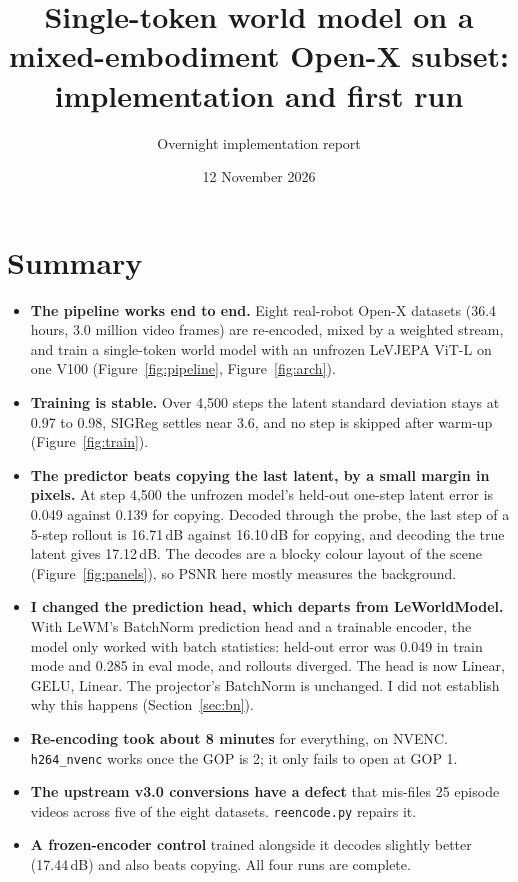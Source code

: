 \documentclass[10pt]{article}
\title{Single-token world model on a mixed-embodiment Open-X subset:\\ implementation and first run}
\author{Overnight implementation report}
\date{12 November 2026}
\newcommand{\code}[1]{\texttt{\small #1}}
\begin{document}
\maketitle

\section{Summary}
\begin{itemize}
\item \textbf{The pipeline works end to end.} Eight real-robot Open-X datasets (36.4 hours,
  3.0 million video frames) are re-encoded, mixed by a weighted stream, and train a
  single-token world model with an unfrozen LeVJEPA ViT-L on one V100
  (Figure~\ref{fig:pipeline}, Figure~\ref{fig:arch}).
\item \textbf{Training is stable.} Over 4{,}500 steps the latent standard deviation stays at
  0.97 to 0.98, SIGReg settles near 3.6, and no step is skipped after warm-up
  (Figure~\ref{fig:train}).
\item \textbf{The predictor beats copying the last latent, by a small margin in pixels.} At
  step 4{,}500 the unfrozen model's held-out one-step latent error is 0.049 against 0.139 for
  copying. Decoded through the probe, the last step of a 5-step rollout is 16.71\,dB against
  16.10\,dB for copying, and decoding the true latent gives 17.12\,dB. The decodes are a
  blocky colour layout of the scene (Figure~\ref{fig:panels}), so PSNR here mostly measures
  the background.
\item \textbf{I changed the prediction head, which departs from LeWorldModel.} With
  LeWM's BatchNorm prediction head and a trainable encoder, the model only worked with
  batch statistics: held-out error was 0.049 in train mode and 0.285 in eval mode, and
  rollouts diverged. The head is now Linear, GELU, Linear. The projector's BatchNorm is
  unchanged. I did not establish why this happens (Section~\ref{sec:bn}).
\item \textbf{Re-encoding took about 8 minutes} for everything, on NVENC. \code{h264\_nvenc}
  works once the GOP is 2; it only fails to open at GOP 1.
\item \textbf{The upstream v3.0 conversions have a defect} that mis-files 25 episode videos
  across five of the eight datasets. \code{reencode.py} repairs it.
\item \textbf{A frozen-encoder control} trained alongside it decodes slightly better
  (17.44\,dB) and also beats copying. All four runs are complete.
\end{itemize}
\end{document}
